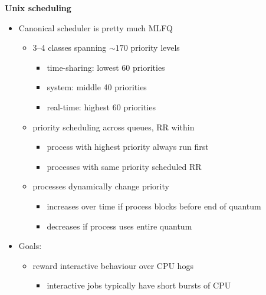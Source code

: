 \documentclass[11pt,a4paper]{article}
\begin{document}
\textbf{Unix scheduling}
\begin{itemize}
    \item Canonical scheduler is pretty much MLFQ
        \begin{itemize}
            \item 3--4 classes spanning $\sim170$ priority levels
                \begin{itemize}
                    \item time-sharing: lowest 60 priorities
                    \item system: middle 40 priorities
                    \item real-time: highest 60 priorities
                \end{itemize}
            \item priority scheduling across queues, RR within
                \begin{itemize}
                    \item process with highest priority always run first
                    \item processes with same priority scheduled RR
                \end{itemize}
            \item processes dynamically change priority
                \begin{itemize}
                    \item increases over time if process blocks before end of quantum
                    \item decreases if process uses entire quantum
                \end{itemize}
        \end{itemize}
    \item Goals:
        \begin{itemize}
            \item reward interactive behaviour over CPU hogs
                \begin{itemize}
                    \item interactive jobs typically have short bursts of CPU
                \end{itemize}
        \end{itemize}
\end{itemize}
\end{document}
